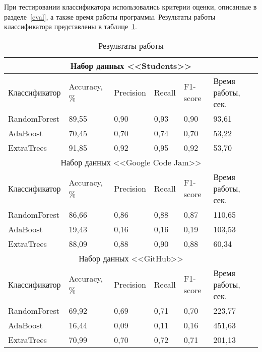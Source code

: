 При тестировании классификатора использовались критерии оценки, описанные в разделе~\ref{eval}, 
а также время работы программы. Результаты работы классификатора представлены в таблице~\ref{tab:results}.

\begin{table}[h!]
\caption{ Результаты работы }
\label{tab:results}
\begin{center}
\begin{tabularx}{\linewidth}{|X|X|X|X|X|X|}
\hline
\multicolumn{6}{|c|}{Набор данных <<Students>>} \\
\hline
Классификатор & Accuracy, \% & Precision & Recall & F1-score & Время работы, сек.\\
\hline
RandomForest & 89,55 & 0,90 & 0,93 & 0,90 & 93,61\\
\hline
AdaBoost & 70,45 & 0,70 & 0,74 & 0,70 & 53,22\\
\hline
ExtraTrees & 91,85 & 0,92 & 0,95 & 0,92 & 53,70 \\
\hline
\multicolumn{6}{|c|}{Набор данных <<Google Code Jam>>} \\
\hline
Классификатор & Accuracy, \% & Precision & Recall & F1-score & Время работы, сек.\\
\hline
RandomForest & 86,66 & 0,86 & 0,88 & 0,87 & 110,65\\
\hline
AdaBoost & 19,43 & 0,16 & 0,16 & 0,19 & 103,53\\
\hline
ExtraTrees & 88,09 & 0,88 & 0,90 & 0,88 & 60,34 \\
\hline
\multicolumn{6}{|c|}{Набор данных <<GitHub>>} \\
\hline
Классификатор & Accuracy, \% & Precision & Recall & F1-score & Время работы, сек.\\
\hline
RandomForest & 69,92 & 0,69 & 0,71 & 0,70 & 223,77\\
\hline
AdaBoost & 16,44 & 0,09 & 0,11 & 0,16 & 451,63\\
\hline
ExtraTrees & 70,99 & 0,70 & 0,72 & 0,71 & 201,13 \\
\hline
\end{tabularx}
\end{center}
\end{table}



